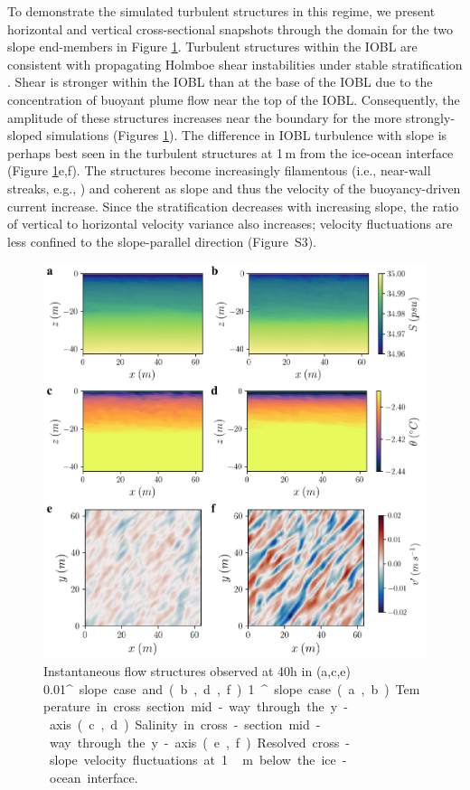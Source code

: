 \documentclass[tc, manuscript]{copernicus}
\begin{document}
To demonstrate the simulated turbulent structures in this regime, we present horizontal and vertical cross-sectional  snapshots through the domain for the two slope end-members in Figure \ref{fig:cross-section}. Turbulent structures within the IOBL are consistent with propagating Holmboe shear instabilities under stable stratification \citep{carpenter_identifying_2010}. Shear is stronger within the IOBL than at the base of the IOBL due to the concentration of buoyant plume flow near the top of the IOBL. Consequently, the amplitude of these structures increases near the boundary for the more strongly-sloped simulations (Figures \ref{fig:cross-section}). The difference in IOBL turbulence with slope is perhaps best seen in the turbulent structures at 1\,\unit{m} from the ice-ocean interface (Figure \ref{fig:cross-section}e,f). The structures become increasingly filamentous (i.e., near-wall streaks, e.g., \citet{del_alamo_spectra_2003, hoyas_scaling_2006}) and coherent as slope and thus the velocity of the buoyancy-driven current increase. Since the stratification decreases with increasing slope, the ratio of vertical to horizontal velocity variance also increases; velocity fluctuations are less confined to the slope-parallel direction (Figure~S3).

\begin{figure}[t]
\includegraphics[width=12cm]{fig5.pdf}
\caption{Instantaneous flow structures observed at 40h in (a,c,e) 0.01\unit{^{\circ}} slope case and (b,d,f) 1\unit{^{\circ}} slope case. (a,b) Temperature in cross section mid-way through the y-axis. (c,d) Salinity in cross-section mid-way through the y-axis. (e,f) Resolved cross-slope velocity fluctuations at 1\,\unit{m} below the ice-ocean interface.}
\label{fig:cross-section}
\end{figure}
\end{document}
